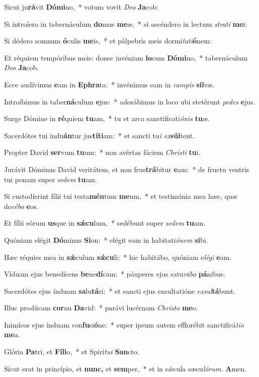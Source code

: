 \item Sicut ju\textbf{rá}vit \textbf{Dó}\textbf{mi}no,~* votum vovit \textit{Deo} \textbf{Ja}cob:
\item Si introíero in tabernáculum \textbf{do}mus \textbf{me}æ,~* si ascéndero in lectum \textit{strati} \textbf{me}i:
\item Si dédero somnum \textbf{ó}culis \textbf{me}is,~* et pálpebris meis dormi\textit{tati}\textbf{ó}nem:
\item Et réquiem tempóribus meis: donec invéniam \textbf{lo}cum \textbf{Dó}\textbf{mi}no,~* tabernáculum \textit{Deo} \textbf{Ja}cob.
\item Ecce audívimus \textbf{e}am in \textbf{E}\textbf{phra}ta:~* invénimus eam in \textit{campis} \textbf{sil}væ.
\item Introíbimus in taber\textbf{ná}culum \textbf{e}jus:~* adorábimus in loco ubi stetérunt \textit{pedes} \textbf{e}jus.
\item Surge Dómine in \textbf{ré}quiem \textbf{tu}am,~* tu et arca sanctificati\textit{ónis} \textbf{tu}æ.
\item Sacerdótes tui indu\textbf{án}tur jus\textbf{tí}\textbf{ti}am:~* et sancti tu\teenyhspace\textit{i} \textit{ex}\textbf{súl}tent.
\item Propter David \textbf{ser}vum \textbf{tu}um:~* non avértas fáciem \textit{Christi} \textbf{tu}i.
\item Jurávit Dóminus David veritátem, et non frus\textbf{trá}bitur \textbf{e}am:~* de fructu ventris tui ponam super \textit{sedem} \textbf{tu}am.
\item Si custodíerint fílii tui testa\textbf{mén}tum \textbf{me}um,~* et testimónia mea hæc, quæ do\hspace{0.02em}\textit{cébo} \textbf{e}os.
\item Et fílii eórum \textbf{us}que in \textbf{sǽ}\textbf{cu}lum,~* sedébunt super \textit{sedem} \textbf{tu}am.
\item Quóniam elégit \textbf{Dó}minus \textbf{Si}on:~* elégit eam in habitati\teenyhspace\textit{ónem} \textbf{si}bi.
\item Hæc réquies mea in \textbf{sǽ}culum \textbf{sǽ}\textbf{cu}li:~* hic habitábo, quóniam e\tinyhspace\textit{légi} \textbf{e}am.
\item Víduam ejus benedícens \textbf{be}ne\textbf{dí}cam:~* páuperes ejus satu\textit{rábo} \textbf{pá}nibus.
\item Sacerdótes ejus índuam \textbf{sa}lu\textbf{tá}ri:~* et sancti ejus exsultatióne \textit{exsul}\textbf{tá}bunt.
\item Illuc prodúcam \textbf{cor}nu \textbf{Da}vid:~* parávi lucérnam \textit{Christo} \textbf{me}o.
\item Inimícos ejus índuam con\textbf{fu}si\textbf{ó}ne:~* super ipsum autem efflorébit sanctificá\tinyhspace\textit{tio} \textbf{me}a.
\item Glória \textbf{Pa}tri, et \textbf{Fí}\textbf{li}o,~* et Spirí\tinyhspace\textit{tui} \textbf{San}cto.
\item Sicut erat in princípio, et \textbf{nunc,} et \textbf{sem}per,~* et in sǽcula sæcu\tinyhspace\textit{lórum.} \textbf{A}men.
